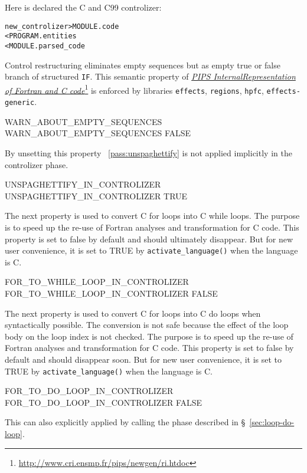 \documentclass[a4paper]{report}
\newenvironment{PipsMake}{\begin{alltt}}{\end{alltt}}
\newcommand{\PipsPassRef}[1]{\texttt{\detokenize{#1}}~\ref{pass:#1}}
\newcommand{\LINK}[2]{\href{#2}{#1}\footnote{\url{#2}}\xspace}
\newcommand{\Pri}{\LINK{\emph{PIPS Internal\space{}Representation of
      Fortran and C code}}{http://www.cri.ensmp.fr/pips/newgen/ri.htdoc}}
\begin{document}
Here is declared the C and C99 controlizer:

\begin{PipsMake}
new_controlizer                     > MODULE.code
        < PROGRAM.entities
        < MODULE.parsed_code
\end{PipsMake}

Control restructuring eliminates empty sequences but as empty true or
false branch of structured \verb/IF/. This semantic property of \Pri{}
is enforced by libraries \verb/effects/,
\verb/regions/, \verb/hpfc/, \verb/effects-generic/.

\begin{PipsProp}{WARN_ABOUT_EMPTY_SEQUENCES}
WARN_ABOUT_EMPTY_SEQUENCES FALSE
\end{PipsProp}


By unsetting this property \PipsPassRef{unspaghettify} is not applied
implicitly in the controlizer phase.

\begin{PipsProp}{UNSPAGHETTIFY_IN_CONTROLIZER}
UNSPAGHETTIFY_IN_CONTROLIZER TRUE
\end{PipsProp}

The next property is used to convert C for loops into C while
loops. The purpose is to speed up the re-use of Fortran analyses and
transformation for C code. This property is set to false by default
and should ultimately disappear. But for new user convenience, it is
set to TRUE by \verb/activate_language()/ when the language is C.

\begin{PipsProp}{FOR_TO_WHILE_LOOP_IN_CONTROLIZER}
FOR_TO_WHILE_LOOP_IN_CONTROLIZER FALSE
\end{PipsProp}

The next property is used to convert C for loops into C do loops when
syntactically possible. The conversion is not safe because the effect of
the loop body on the loop index is not checked. The purpose is to speed up
the re-use of Fortran analyses and transformation for C code. This
property is set to false by default and should disappear soon. But for
new user convenience, it is set to TRUE by \verb/activate_language()/
when the language is C.

\begin{PipsProp}{FOR_TO_DO_LOOP_IN_CONTROLIZER}
FOR_TO_DO_LOOP_IN_CONTROLIZER FALSE
\end{PipsProp}

This can also explicitly applied by calling the phase described in
\S~\ref{sec:loop-do-loop}.
\end{document}
